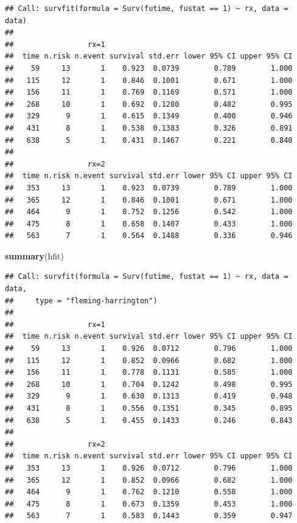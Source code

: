 \documentclass[
]{article}
\newenvironment{Shaded}{\begin{snugshade}}{\end{snugshade}}
\newcommand{\FunctionTok}[1]{\textcolor[rgb]{0.13,0.29,0.53}{\textbf{#1}}}
\newcommand{\NormalTok}[1]{#1}
\begin{document}
\begin{verbatim}
## Call: survfit(formula = Surv(futime, fustat == 1) ~ rx, data = data)
## 
##                 rx=1 
##  time n.risk n.event survival std.err lower 95% CI upper 95% CI
##    59     13       1    0.923  0.0739        0.789        1.000
##   115     12       1    0.846  0.1001        0.671        1.000
##   156     11       1    0.769  0.1169        0.571        1.000
##   268     10       1    0.692  0.1280        0.482        0.995
##   329      9       1    0.615  0.1349        0.400        0.946
##   431      8       1    0.538  0.1383        0.326        0.891
##   638      5       1    0.431  0.1467        0.221        0.840
## 
##                 rx=2 
##  time n.risk n.event survival std.err lower 95% CI upper 95% CI
##   353     13       1    0.923  0.0739        0.789        1.000
##   365     12       1    0.846  0.1001        0.671        1.000
##   464      9       1    0.752  0.1256        0.542        1.000
##   475      8       1    0.658  0.1407        0.433        1.000
##   563      7       1    0.564  0.1488        0.336        0.946
\end{verbatim}

\begin{Shaded}
\begin{Highlighting}[]
\FunctionTok{summary}\NormalTok{(hfit)}
\end{Highlighting}
\end{Shaded}

\begin{verbatim}
## Call: survfit(formula = Surv(futime, fustat == 1) ~ rx, data = data, 
##     type = "fleming-harrington")
## 
##                 rx=1 
##  time n.risk n.event survival std.err lower 95% CI upper 95% CI
##    59     13       1    0.926  0.0712        0.796        1.000
##   115     12       1    0.852  0.0966        0.682        1.000
##   156     11       1    0.778  0.1131        0.585        1.000
##   268     10       1    0.704  0.1242        0.498        0.995
##   329      9       1    0.630  0.1313        0.419        0.948
##   431      8       1    0.556  0.1351        0.345        0.895
##   638      5       1    0.455  0.1433        0.246        0.843
## 
##                 rx=2 
##  time n.risk n.event survival std.err lower 95% CI upper 95% CI
##   353     13       1    0.926  0.0712        0.796        1.000
##   365     12       1    0.852  0.0966        0.682        1.000
##   464      9       1    0.762  0.1210        0.558        1.000
##   475      8       1    0.673  0.1359        0.453        1.000
##   563      7       1    0.583  0.1443        0.359        0.947
\end{verbatim}
\end{document}
